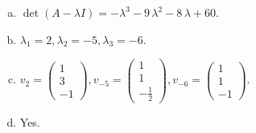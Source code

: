 \begin{questions}
\begin{solution}
\begin{enumerate}[(a)]
\item $\det(A-\lambda I)=-{\lambda}^{3} - 9 \, {\lambda}^{2} - 8 \, {\lambda} + 60$.
\item ${\lambda}_1=2, {\lambda}_2=-5, {\lambda}_3=-6$.
\item $v_{2}=\left(\begin{array}{r}
1 \\
3 \\
-1
\end{array}\right), v_{-5}=\left(\begin{array}{r}
1 \\
1 \\
-\frac{1}{2}
\end{array}\right), v_{-6}=\left(\begin{array}{r}
1 \\
1 \\
-1
\end{array}\right)$.
\item Yes.
\end{enumerate}
\end{solution}

\end{questions}

\newpage


\begin{center}
\end{center}

